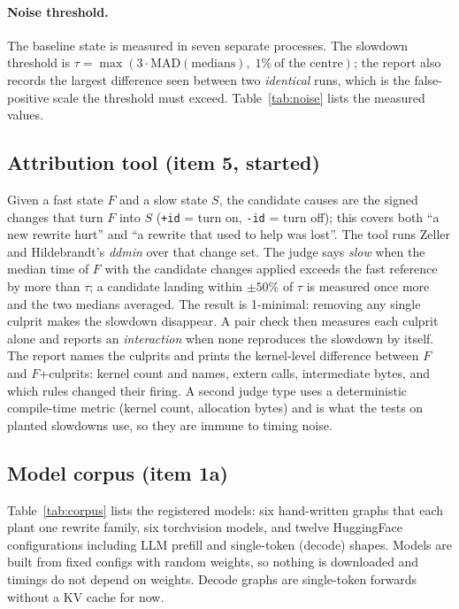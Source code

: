 \documentclass[11pt]{article}
\newcommand{\code}[1]{\texttt{#1}}
\begin{document}
\paragraph{Noise threshold.} The baseline state is measured in seven separate processes. The
slowdown threshold is $\tau=\max(3\cdot\mathrm{MAD}(\text{medians}),\;1\%\ \text{of the centre})$;
the report also records the largest difference seen between two \emph{identical} runs, which is the
false-positive scale the threshold must exceed. Table~\ref{tab:noise} lists the measured values.

\subsection{Attribution tool (item 5, started)}\label{sec:attr-method}
Given a fast state $F$ and a slow state $S$, the candidate causes are the signed changes that turn
$F$ into $S$ (\code{+id} = turn on, \code{-id} = turn off); this covers both ``a new rewrite
hurt'' and ``a rewrite that used to help was lost''. The tool runs Zeller and Hildebrandt's
\emph{ddmin} over that change set. The judge says \emph{slow} when the median time of $F$ with the
candidate changes applied exceeds the fast reference by more than $\tau$; a candidate landing within
$\pm50\%$ of $\tau$ is measured once more and the two medians averaged. The result is 1-minimal:
removing any single culprit makes the slowdown disappear. A pair check then measures each culprit
alone and reports an \emph{interaction} when none reproduces the slowdown by itself. The report
names the culprits and prints the kernel-level difference between $F$ and $F$+culprits: kernel
count and names, extern calls, intermediate bytes, and which rules changed their firing. A
second judge type uses a deterministic compile-time metric (kernel count, allocation bytes) and is
what the tests on planted slowdowns use, so they are immune to timing noise.

\subsection{Model corpus (item 1a)}
Table~\ref{tab:corpus} lists the registered models: six hand-written
graphs that each plant one rewrite family, six torchvision models, and twelve HuggingFace
configurations including LLM prefill and single-token (decode) shapes. Models are built from fixed
configs with random weights, so nothing is downloaded and timings do not depend on weights. Decode
graphs are single-token forwards without a KV cache for now.

\end{document}
